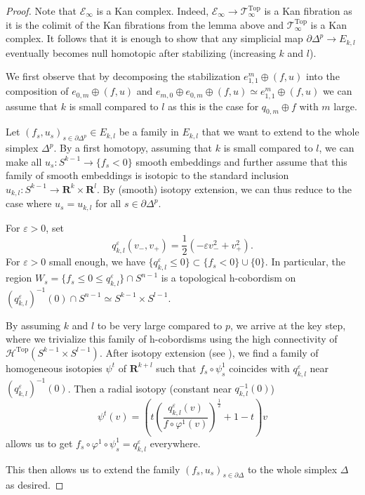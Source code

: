 \documentclass[reqno]{amsart}
\renewcommand{\epsilon}{\varepsilon}
\theoremstyle{theorem}
\theoremstyle{remark}
\theoremstyle{definition}
\newcommand{\T}{\mathcal{T}}
\newcommand{\del}{\partial}
\newcommand{\HH}{\mathcal{H}}
\newcommand{\E}{\mathcal{E}}
\newcommand{\R}{\mathbf{R}}
\newcommand{\TOP}{\mathrm{Top}}
\begin{document}
\begin{proof}
  Note that $\E_\infty$ is a Kan complex. Indeed, $\E_\infty \to \T^\TOP_\infty$ is a Kan fibration as it is the colimit of the Kan fibrations from the lemma above and $\T^\TOP_\infty$ is a Kan complex. It follows that it is enough to show that any simplicial map $\partial \Delta^p \to E_{k,l}$ eventually becomes null homotopic after stabilizing (increasing $k$ and $l$).
  


  
  We first observe that by decomposing the stabilization $e_{1,1}^m\oplus (f,u)$ into the composition of $e_{0,m}\oplus (f,u)$ and $e_{m,0}\oplus e_{0,m}\oplus (f,u) \simeq e_{1,1}^m\oplus (f,u)$
  we can assume that $k$ is small compared to $l$ as this is the case for $q_{0,m}\oplus f$ with $m$ large.
  
  Let $(f_s,u_s)_{s\in \del \Delta^p}\in E_{k,l}$ be a family in $E_{k,l}$ that we want to extend to the whole simplex $\Delta^p$.
  By a first homotopy, assuming that $k$ is small compared to $l$, we can make all $u_s : S^{k-1}\to \{f_s <0\}$ smooth embeddings
  and further assume that this family of smooth embeddings is isotopic to the standard inclusion $u_{k,l} : S^{k-1}\to \R^k\times \R^l$.
  By (smooth) isotopy extension, we can thus reduce to the case where $u_s=u_{k,l}$ for all $s\in \del \Delta^p$.
  
  For $\epsilon >0$, set 
  \[q_{k,l}^\epsilon(v_-,v_+)=\frac{1}{2}(-\epsilon v_-^2+v_+^2).\]
  For $\epsilon >0$ small enough,
  we have $\{q_{k,l}^\epsilon \leq 0\} \subset \{f_s <0\}\cup\{0\}$. In particular, the region
  $W_s=\{f_s\leq 0 \leq q^\epsilon_{k,l}\}\cap S^{n-1}$ is a topological h-cobordism on $(q^\epsilon_{k,l})^{-1}(0)\cap S^{n-1}\simeq S^{k-1}\times S^{l-1}$.


  
  By assuming $k$ and $l$ to be very large compared to $p$, we arrive at the key step, where we trivialize this family of h-cobordisms using the high connectivity of $\HH^\TOP(S^{k-1}\times S^{l-1})$. After isotopy extension (see \cite{EK71}), we 
  find a family of homogeneous isotopies $\psi^t$ of $\R^{k+l}$ such that $f_s\circ \psi^1_s$ coincides
  with $q_{k,l}^\epsilon$ near $(q_{k,l}^\epsilon)^{-1}(0)$. Then a radial isotopy (constant near $q_{k,l}^{-1}(0)$)
  \[\psi^t(v)=\left(t\left(\frac{q^\epsilon_{k,l}(v)}{f\circ\varphi^1(v)}\right)^{\frac{1}{2}}+1-t\right)v\]
  allows us to get $f_s\circ \varphi^1\circ \psi^1_s =q^\epsilon_{k,l}$ everywhere.
  
  This then allows us to extend the family $(f_s,u_s)_{s\in \del \Delta}$
  to the whole simplex $\Delta$ as desired.
\end{proof}
\end{document}
